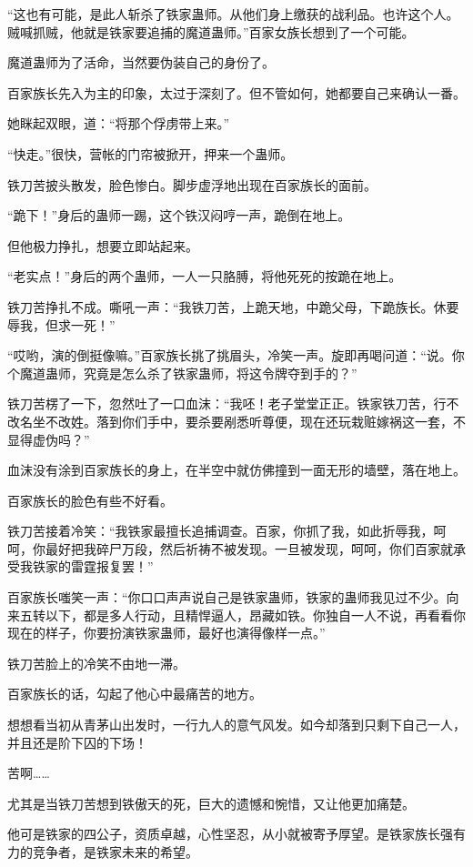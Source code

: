 \begin{this_body}
“这也有可能，是此人斩杀了铁家蛊师。从他们身上缴获的战利品。也许这个人。贼喊抓贼，他就是铁家要追捕的魔道蛊师。”百家女族长想到了一个可能。

魔道蛊师为了活命，当然要伪装自己的身份了。

百家族长先入为主的印象，太过于深刻了。但不管如何，她都要自己来确认一番。

她眯起双眼，道：“将那个俘虏带上来。”

“快走。”很快，营帐的门帘被掀开，押来一个蛊师。

铁刀苦披头散发，脸色惨白。脚步虚浮地出现在百家族长的面前。

“跪下！”身后的蛊师一踢，这个铁汉闷哼一声，跪倒在地上。

但他极力挣扎，想要立即站起来。

“老实点！”身后的两个蛊师，一人一只胳膊，将他死死的按跪在地上。

铁刀苦挣扎不成。嘶吼一声：“我铁刀苦，上跪天地，中跪父母，下跪族长。休要辱我，但求一死！”

“哎哟，演的倒挺像嘛。”百家族长挑了挑眉头，冷笑一声。旋即再喝问道：“说。你个魔道蛊师，究竟是怎么杀了铁家蛊师，将这令牌夺到手的？”

铁刀苦楞了一下，忽然吐了一口血沫：“我呸！老子堂堂正正。铁家铁刀苦，行不改名坐不改姓。落到你们手中，要杀要剐悉听尊便，现在还玩栽赃嫁祸这一套，不显得虚伪吗？”

血沫没有涂到百家族长的身上，在半空中就仿佛撞到一面无形的墙壁，落在地上。

百家族长的脸色有些不好看。

铁刀苦接着冷笑：“我铁家最擅长追捕调查。百家，你抓了我，如此折辱我，呵呵，你最好把我碎尸万段，然后祈祷不被发现。一旦被发现，呵呵，你们百家就承受我铁家的雷霆报复罢！”

百家族长嗤笑一声：“你口口声声说自己是铁家蛊师，铁家的蛊师我见过不少。向来五转以下，都是多人行动，且精悍逼人，昂藏如铁。你独自一人不说，再看看你现在的样子，你要扮演铁家蛊师，最好也演得像样一点。”

铁刀苦脸上的冷笑不由地一滞。

百家族长的话，勾起了他心中最痛苦的地方。

想想看当初从青茅山出发时，一行九人的意气风发。如今却落到只剩下自己一人，并且还是阶下囚的下场！

苦啊……

尤其是当铁刀苦想到铁傲天的死，巨大的遗憾和惋惜，又让他更加痛楚。

他可是铁家的四公子，资质卓越，心性坚忍，从小就被寄予厚望。是铁家族长强有力的竞争者，是铁家未来的希望。


\end{this_body}
